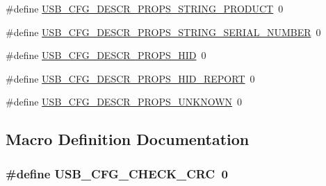 \begin{DoxyCompactItemize}
\#define \hyperlink{mhvlib-_vusb-_console_2vusb_2usbconfig-prototype_8h_aa08084f9755a643e02d469b66b129ef6}{U\-S\-B\-\_\-\-C\-F\-G\-\_\-\-D\-E\-S\-C\-R\-\_\-\-P\-R\-O\-P\-S\-\_\-\-S\-T\-R\-I\-N\-G\-\_\-\-P\-R\-O\-D\-U\-C\-T}~0
\item 
\#define \hyperlink{mhvlib-_vusb-_console_2vusb_2usbconfig-prototype_8h_a82224c07d3a1f9fcccbff70b71c8ea51}{U\-S\-B\-\_\-\-C\-F\-G\-\_\-\-D\-E\-S\-C\-R\-\_\-\-P\-R\-O\-P\-S\-\_\-\-S\-T\-R\-I\-N\-G\-\_\-\-S\-E\-R\-I\-A\-L\-\_\-\-N\-U\-M\-B\-E\-R}~0
\item 
\#define \hyperlink{mhvlib-_vusb-_console_2vusb_2usbconfig-prototype_8h_adfbd53b5310c36b1e4b06d6a3b992e8a}{U\-S\-B\-\_\-\-C\-F\-G\-\_\-\-D\-E\-S\-C\-R\-\_\-\-P\-R\-O\-P\-S\-\_\-\-H\-I\-D}~0
\item 
\#define \hyperlink{mhvlib-_vusb-_console_2vusb_2usbconfig-prototype_8h_a248eae427d6cea0046661eb8438b7198}{U\-S\-B\-\_\-\-C\-F\-G\-\_\-\-D\-E\-S\-C\-R\-\_\-\-P\-R\-O\-P\-S\-\_\-\-H\-I\-D\-\_\-\-R\-E\-P\-O\-R\-T}~0
\item 
\#define \hyperlink{mhvlib-_vusb-_console_2vusb_2usbconfig-prototype_8h_a3c9ed2d932cf0f5fc9788a91028a8b4b}{U\-S\-B\-\_\-\-C\-F\-G\-\_\-\-D\-E\-S\-C\-R\-\_\-\-P\-R\-O\-P\-S\-\_\-\-U\-N\-K\-N\-O\-W\-N}~0
\end{DoxyCompactItemize}


\subsection{Macro Definition Documentation}
\hypertarget{mhvlib-_vusb-_console_2vusb_2usbconfig-prototype_8h_a57122aa75d9b598adcd238aee5f2b4b7}{
\subsubsection[{U\-S\-B\-\_\-\-C\-F\-G\-\_\-\-C\-H\-E\-C\-K\-\_\-\-C\-R\-C}]{\setlength{\rightskip}{0pt plus 5cm}\#define U\-S\-B\-\_\-\-C\-F\-G\-\_\-\-C\-H\-E\-C\-K\-\_\-\-C\-R\-C~0}}\label{mhvlib-_vusb-_console_2vusb_2usbconfig-prototype_8h_a57122aa75d9b598adcd238aee5f2b4b7}


